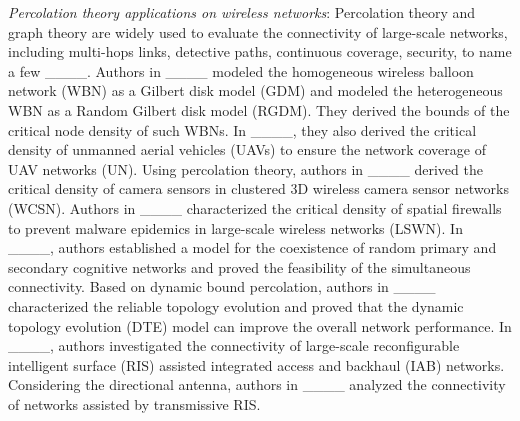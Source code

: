 \indent \textit{Percolation theory applications on wireless networks}: Percolation theory and graph theory are widely used to evaluate the connectivity of large-scale networks, including multi-hops links, detective paths, continuous coverage, security, to name a few ____. Authors in ____ modeled the homogeneous wireless balloon network (WBN) as a Gilbert disk model (GDM) and modeled the heterogeneous WBN as a Random Gilbert disk model (RGDM).
They derived the bounds of the critical node density of such WBNs. In ____, they also derived the critical density of unmanned aerial vehicles (UAVs) to ensure the network coverage of UAV networks (UN). Using percolation theory, authors in ____ derived the critical density of camera sensors in clustered 3D wireless camera sensor networks (WCSN). Authors in ____ characterized the critical density of spatial firewalls to prevent malware epidemics in large-scale wireless networks (LSWN). In ____, authors established a model for the coexistence of random primary and secondary cognitive networks and proved the feasibility of the simultaneous connectivity. Based on dynamic bound percolation, authors in ____ characterized the reliable topology evolution and proved that the dynamic topology evolution (DTE) model can improve the overall network performance.
In ____, authors investigated the connectivity of large-scale reconfigurable intelligent surface (RIS) assisted integrated access and backhaul (IAB) networks.
Considering the directional antenna, authors in ____ analyzed the connectivity of networks assisted by transmissive RIS.